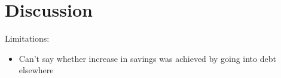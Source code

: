 
\section{Discussion}%
\label{sec:discussion}

Limitations:
\begin{itemize}
    \item Can't say whether increase in savings was achieved by going into
        debt elsewhere
\end{itemize}
